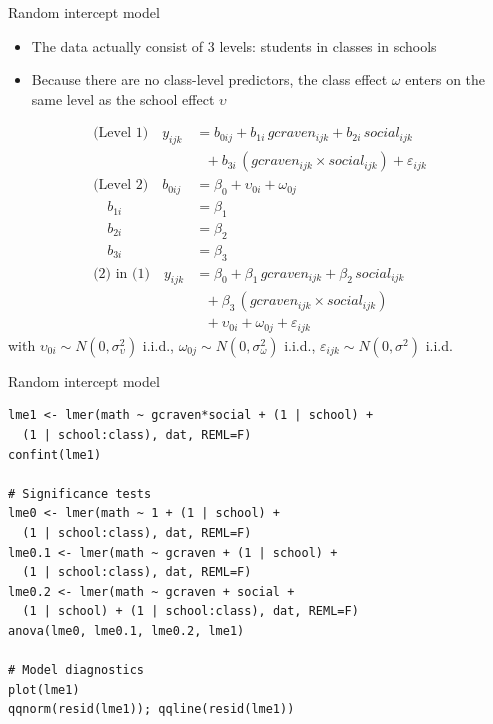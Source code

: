 \documentclass{beamer}
\begin{document}
\begin{frame}{Random intercept model}
  \begin{itemize}
    \item The data actually consist of 3 levels: students in classes in
      schools
    \item Because there are no class-level predictors, the class effect
      $\omega$ enters on the same level as the school effect $\upsilon$
  \end{itemize}
\begin{align*}
\text{(Level 1)} \quad y_{ijk} &= b_{0ij} + b_{1i}\,gcraven_{ijk} + b_{2i}\,social_{ijk}\\
                  &~~~+ b_{3i}\,(gcraven_{ijk} \times social_{ijk}) +
                  \varepsilon_{ijk}\\
  \text{(Level 2)} \quad b_{0ij} &= \beta_0 + \upsilon_{0i} + \omega_{0j}\\
                  \quad b_{1i} &= \beta_1\\
                  \quad b_{2i} &= \beta_2\\
                  \quad b_{3i} &= \beta_3\\
\text{(2) in (1)} \quad y_{ijk} &= \beta_{0} + \beta_{1}\,gcraven_{ijk} +
  \beta_{2}\,social_{ijk}\\
                              &~~~ + \beta_{3}\,(gcraven_{ijk} \times social_{ijk})\\
                              &~~~ + \upsilon_{0i} + \omega_{0j} +
                              \varepsilon_{ijk}
\end{align*}
  \hspace{-.1cm}with $\upsilon_{0i} \sim N(0, \sigma^2_{\upsilon})$ i.i.d.,
$\omega_{0j} \sim N(0, \sigma^2_{\omega})$ i.i.d.,
$\varepsilon_{ijk} \sim N(0, \sigma^2)$ i.i.d.
\end{frame}

{

\begin{frame}[fragile]{Random intercept model}
  \begin{lstlisting}
lme1 <- lmer(math ~ gcraven*social + (1 | school) + 
  (1 | school:class), dat, REML=F)
confint(lme1)

# Significance tests
lme0 <- lmer(math ~ 1 + (1 | school) + 
  (1 | school:class), dat, REML=F)
lme0.1 <- lmer(math ~ gcraven + (1 | school) + 
  (1 | school:class), dat, REML=F)
lme0.2 <- lmer(math ~ gcraven + social + 
  (1 | school) + (1 | school:class), dat, REML=F)
anova(lme0, lme0.1, lme0.2, lme1)

# Model diagnostics
plot(lme1)
qqnorm(resid(lme1)); qqline(resid(lme1))
  \end{lstlisting}
\end{frame}

}
\end{document}
